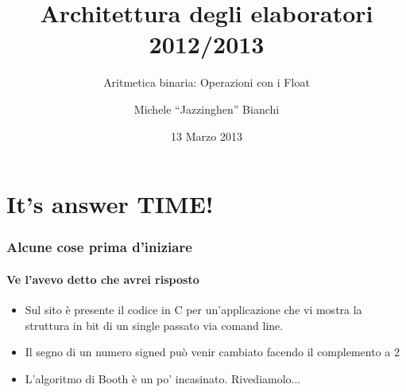 \documentclass{beamer}
\title[Arch2013] %
{Architettura degli elaboratori 2012/2013}
\subtitle{Aritmetica binaria: Operazioni con i Float}
\author{Michele ``Jazzinghen'' Bianchi\inst{1}}
\institute[DISI] %
{
  \inst{1}%
  Dipartimento di Ingegneria e Scienze dell'Informazione\\
  Universtià degli Studi di Trento
}
\date[2013-03-13] %
{13 Marzo 2013}
\begin{document}
	\frame{\titlepage}
	\section{It's answer TIME!}
	\begin{frame}
    \frametitle{Alcune cose prima d'iniziare}
    \framesubtitle{Ve l'avevo detto che avrei risposto}
		\begin{itemize}
			\item Sul sito è presente il codice in C per un'applicazione che vi
				mostra la struttura in bit di un single passato via comand line.
			\item Il segno di un numero signed può venir cambiato facendo il complemento a 2
			\item L'algoritmo di Booth è un po' incasinato. Rivediamolo...
		\end{itemize}
	\end{frame}   
   
\end{document}
